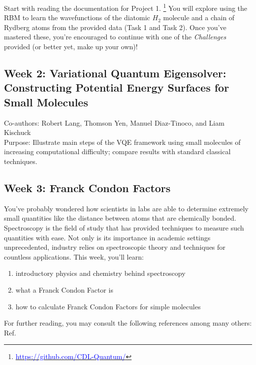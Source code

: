 \documentclass[12pt]{article}
\begin{document}
Start with reading the documentation for Project 1.
\footnote{\href{https://github.com/CDL-Quantum/CohortProject_2020/tree/master/Project_1_RBM_and_Tomography}
{\textcolor{blue}{https://github.com/CDL-Quantum/}}}
You will explore using the RBM to learn the wavefunctions of the diatomic $H_2$ molecule 
and a chain of Rydberg atoms from the provided data (Task 1 and Task 2).  
Once you've mastered these, you're encouraged to continue with one of the {\it Challenges} provided (or better yet, make up your own)!

\newpage


\subsection{Week 2: Variational Quantum Eigensolver: Constructing Potential Energy Surfaces for Small Molecules}

Co-authors: Robert Lang, Thomson Yen, Manuel Diaz-Tinoco, and Liam Kischuck
\\
Purpose: Illustrate main steps of the VQE framework using small molecules of increasing computational difficulty; compare results with standard classical techniques.

\newpage

\subsection{Week 3: Franck Condon Factors}

You've probably wondered how scientists in labs are able to determine extremely small quantities like the distance between atoms that are chemically bonded. 
Spectroscopy is the field of study that has provided techniques to measure such quantities with ease. Not only is its importance in academic settings unprecedented, industry relies on spectroscopic theory and techniques for countless applications. This week, you'll learn:

\begin{enumerate}
    \item introductory physics and chemistry behind spectroscopy
    \item what a Franck Condon Factor is
    \item how to calculate Franck Condon Factors for simple molecules
\end{enumerate}

For further reading, you may consult the following references among many others: Ref.~\cite{quesadaFranckCondonFactorsCounting2019,wrightFranckCondonFactorsTheir1999,fantzFranckCondonFactors2006}
\end{document}
